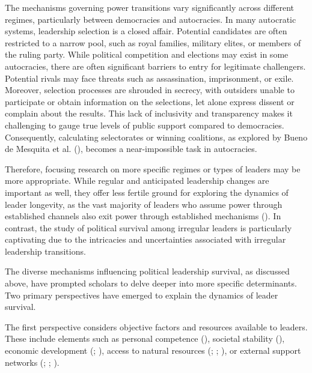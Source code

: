 \documentclass[
  12pt,
]{report}
\begin{document}
The mechanisms governing power transitions vary significantly across
different regimes, particularly between democracies and autocracies. In
many autocratic systems, leadership selection is a closed affair.
Potential candidates are often restricted to a narrow pool, such as
royal families, military elites, or members of the ruling party. While
political competition and elections may exist in some autocracies, there
are often significant barriers to entry for legitimate challengers.
Potential rivals may face threats such as assassination, imprisonment,
or exile. Moreover, selection processes are shrouded in secrecy, with
outsiders unable to participate or obtain information on the selections,
let alone express dissent or complain about the results. This lack of
inclusivity and transparency makes it challenging to gauge true levels
of public support compared to democracies. Consequently, calculating
selectorates or winning coalitions, as explored by Bueno de Mesquita et
al. (), becomes a
near-impossible task in autocracies.

Therefore, focusing research on more specific regimes or types of
leaders may be more appropriate. While regular and anticipated
leadership changes are important as well, they offer less fertile ground
for exploring the dynamics of leader longevity, as the vast majority of
leaders who assume power through established channels also exit power
through established mechanisms (). In contrast, the study of political
survival among irregular leaders is particularly captivating due to the
intricacies and uncertainties associated with irregular leadership
transitions.

The diverse mechanisms influencing political leadership survival, as
discussed above, have prompted scholars to delve deeper into more
specific determinants. Two primary perspectives have emerged to explain
the dynamics of leader survival.

The first perspective considers objective factors and resources
available to leaders. These include elements such as personal competence
(), societal stability
(), economic development
(;
), access to natural resources
(;
;
), or external
support networks (;
; ).
\end{document}
